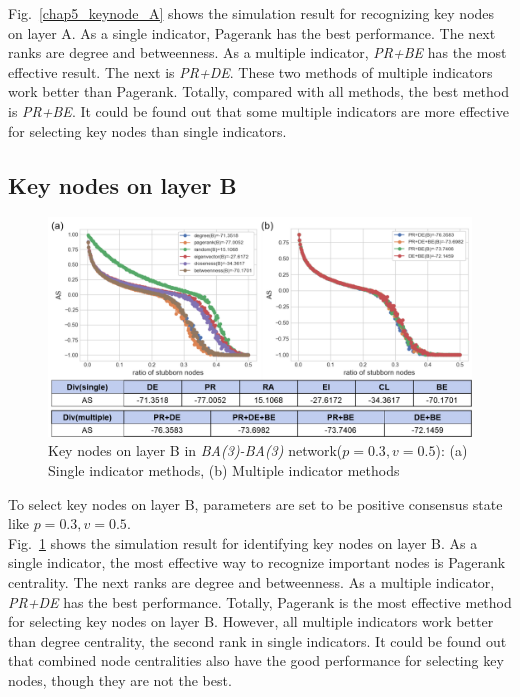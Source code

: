 Fig.~\ref{chap5_keynode_A} shows the simulation result for recognizing key nodes on layer A. As a single indicator, Pagerank has the best performance. The next ranks are degree and betweenness. As a multiple indicator, \textit{PR+BE} has the most effective result. The next is \textit{PR+DE}. These two methods of multiple indicators work better than Pagerank. Totally, compared with all methods, the best method is \textit{PR+BE}. It could be found out that some multiple indicators are more effective for selecting key nodes than single indicators. \\

\subsection{Key nodes on layer B}
\label{layerB}
\begin{figure}[!htb]
	\centering
	\includegraphics[width=\hsize]{figure/chap5_keynode_B.png}
	\caption{Key nodes on layer B in \textit{BA(3)-BA(3)} network($p=0.3, v=0.5$): (a) Single indicator methods, (b) Multiple indicator methods}
	\label{chap5_keynode_B}
\end{figure}

To select key nodes on layer B, parameters are set to be positive consensus state like $p=0.3, v=0.5$.\\
Fig.~\ref{chap5_keynode_B} shows the simulation result for identifying key nodes on layer B. As a single indicator, the most effective way to recognize important nodes is Pagerank centrality. The next ranks are degree and betweenness. As a multiple indicator, \textit{PR+DE} has the best performance. Totally, Pagerank is the most effective method for selecting key nodes on layer B. However, all multiple indicators work better than degree centrality, the second rank in single indicators. It could be found out that combined node centralities also have the good performance for selecting key nodes, though they are not the best. \\

